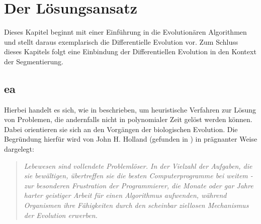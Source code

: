 \chapter{Der Lösungsansatz}
\label{chap:sol}

	Dieses Kapitel beginnt mit einer Einführung in die Evolutionären Algorithmen und stellt daraus exemplarisch die Differentielle Evolution vor. Zum Schluss dieses Kapitels folgt eine Einbindung der Differentiellen Evolution in den Kontext der Segmentierung.

	\section{\gls{ea}}
	\label{sec:evol}
	
		Hierbei handelt es sich, wie in \cite{ea-intro} beschrieben, um heuristische Verfahren zur Lösung von Problemen, die andernfalls nicht in polynomialer Zeit gelöst werden können. Dabei orientieren sie sich an den Vorgängen der biologischen Evolution. Die Begründung hierfür wird von John H. Holland (gefunden in \cite{ger-kla-kru-intro}) in prägnanter Weise dargelegt: 
	
		\begin{quote}
			\textit{Lebewesen sind vollendete Problemlöser. In der Vielzahl der Aufgaben, die sie bewältigen, übertreffen sie die besten Computerprogramme bei weitem - zur besonderen Frustration der Programmierer, die Monate oder gar Jahre harter geistiger Arbeit für einen Algorithmus aufwenden, während Organismen ihre Fähigkeiten durch den scheinbar ziellosen Mechanismus der Evolution erwerben.}
		\end{quote}
	
